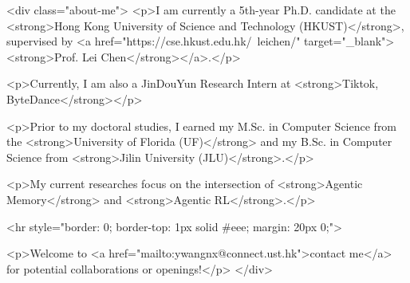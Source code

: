 <div class="about-me">
    <p>I am currently a 5th-year Ph.D. candidate at the <strong>Hong Kong University of Science and Technology (HKUST)</strong>, supervised by <a href="https://cse.hkust.edu.hk/~leichen/" target="_blank"><strong>Prof. Lei Chen</strong></a>.</p>

    <p>Currently, I am also a JinDouYun Research Intern at <strong>Tiktok, ByteDance</strong></p>
    
    <p>Prior to my doctoral studies, I earned my M.Sc. in Computer Science from the <strong>University of Florida (UF)</strong> and my B.Sc. in Computer Science from <strong>Jilin University (JLU)</strong>.</p>

    <p>My current researches focus on the intersection of <strong>Agentic Memory</strong> and <strong>Agentic RL</strong>.</p>

    <hr style="border: 0; border-top: 1px solid #eee; margin: 20px 0;">
    
    <p>Welcome to <a href="mailto:ywangnx@connect.ust.hk">contact me</a> for potential collaborations or openings!</p>
</div>